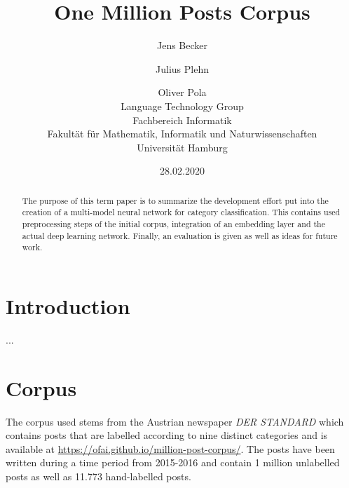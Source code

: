 \documentclass[11pt,a4paper]{article}
\title{One Million Posts Corpus}
\author{Jens Becker \and Julius Plehn \and Oliver Pola \\ 
	Language Technology Group \\
	Fachbereich Informatik \\
	Fakultät für Mathematik, Informatik und Naturwissenschaften \\
	Universität Hamburg
}
\date{28.02.2020}
\begin{document}
\maketitle
\begin{abstract}
The purpose of this term paper is to summarize the development effort put into the creation of a multi-model neural network for category classification. This contains used preprocessing steps of the initial corpus, integration of an embedding layer and the actual deep learning network. Finally, an evaluation is given as well as ideas for future work. 

 
\end{abstract}

\section{Introduction}

...~\cite{Schabus17, Schabus18}

\section{Corpus}
The corpus used stems from the Austrian newspaper \textit{DER STANDARD} which contains posts that are labelled according to nine distinct categories and is available at \url{https://ofai.github.io/million-post-corpus/}. The posts have been written during a time period from 2015-2016 and contain 1 million unlabelled posts as well as 11.773 hand-labelled posts.
\end{document}
